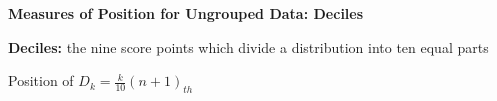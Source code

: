 \begin{center}
\textbf{Measures of Position for Ungrouped Data: Deciles}
\end{center}

\vspace*{1ex}

\textbf{Deciles:} the nine score points which divide a distribution into 
ten equal parts
\begin{center}
Position of $D_k = \displaystyle \frac{k}{10}(n+1)_{th} $
\end{center} 